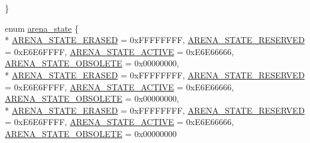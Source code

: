 \begin{DoxyCompactItemize}
 \}
\item 
enum \hyperlink{group___p_i_o_s___f_l_a_s_h_f_s_gaa936149cfd5559190d20879c10e0fcee}{arena\-\_\-state} \{ \\*
\hyperlink{group___p_i_o_s___f_l_a_s_h_f_s_ggaa936149cfd5559190d20879c10e0fceea0868f5f69dae5f489f86f324fb2ec026}{A\-R\-E\-N\-A\-\_\-\-S\-T\-A\-T\-E\-\_\-\-E\-R\-A\-S\-E\-D} = 0x\-F\-F\-F\-F\-F\-F\-F\-F, 
\hyperlink{group___p_i_o_s___f_l_a_s_h_f_s_ggaa936149cfd5559190d20879c10e0fceeac20424e4b3a3a918490e8c307996fe7c}{A\-R\-E\-N\-A\-\_\-\-S\-T\-A\-T\-E\-\_\-\-R\-E\-S\-E\-R\-V\-E\-D} = 0x\-E6\-E6\-F\-F\-F\-F, 
\hyperlink{group___p_i_o_s___f_l_a_s_h_f_s_ggaa936149cfd5559190d20879c10e0fceea8bac821a323307ac4aa7b2de12f4896b}{A\-R\-E\-N\-A\-\_\-\-S\-T\-A\-T\-E\-\_\-\-A\-C\-T\-I\-V\-E} = 0x\-E6\-E66666, 
\hyperlink{group___p_i_o_s___f_l_a_s_h_f_s_ggaa936149cfd5559190d20879c10e0fceea3943698e7097dd06c6b54f71548d426e}{A\-R\-E\-N\-A\-\_\-\-S\-T\-A\-T\-E\-\_\-\-O\-B\-S\-O\-L\-E\-T\-E} = 0x00000000, 
\\*
\hyperlink{group___p_i_o_s___f_l_a_s_h_f_s_ggaa936149cfd5559190d20879c10e0fceea0868f5f69dae5f489f86f324fb2ec026}{A\-R\-E\-N\-A\-\_\-\-S\-T\-A\-T\-E\-\_\-\-E\-R\-A\-S\-E\-D} = 0x\-F\-F\-F\-F\-F\-F\-F\-F, 
\hyperlink{group___p_i_o_s___f_l_a_s_h_f_s_ggaa936149cfd5559190d20879c10e0fceeac20424e4b3a3a918490e8c307996fe7c}{A\-R\-E\-N\-A\-\_\-\-S\-T\-A\-T\-E\-\_\-\-R\-E\-S\-E\-R\-V\-E\-D} = 0x\-E6\-E6\-F\-F\-F\-F, 
\hyperlink{group___p_i_o_s___f_l_a_s_h_f_s_ggaa936149cfd5559190d20879c10e0fceea8bac821a323307ac4aa7b2de12f4896b}{A\-R\-E\-N\-A\-\_\-\-S\-T\-A\-T\-E\-\_\-\-A\-C\-T\-I\-V\-E} = 0x\-E6\-E66666, 
\hyperlink{group___p_i_o_s___f_l_a_s_h_f_s_ggaa936149cfd5559190d20879c10e0fceea3943698e7097dd06c6b54f71548d426e}{A\-R\-E\-N\-A\-\_\-\-S\-T\-A\-T\-E\-\_\-\-O\-B\-S\-O\-L\-E\-T\-E} = 0x00000000, 
\\*
\hyperlink{group___p_i_o_s___f_l_a_s_h_f_s_ggaa936149cfd5559190d20879c10e0fceea0868f5f69dae5f489f86f324fb2ec026}{A\-R\-E\-N\-A\-\_\-\-S\-T\-A\-T\-E\-\_\-\-E\-R\-A\-S\-E\-D} = 0x\-F\-F\-F\-F\-F\-F\-F\-F, 
\hyperlink{group___p_i_o_s___f_l_a_s_h_f_s_ggaa936149cfd5559190d20879c10e0fceeac20424e4b3a3a918490e8c307996fe7c}{A\-R\-E\-N\-A\-\_\-\-S\-T\-A\-T\-E\-\_\-\-R\-E\-S\-E\-R\-V\-E\-D} = 0x\-E6\-E6\-F\-F\-F\-F, 
\hyperlink{group___p_i_o_s___f_l_a_s_h_f_s_ggaa936149cfd5559190d20879c10e0fceea8bac821a323307ac4aa7b2de12f4896b}{A\-R\-E\-N\-A\-\_\-\-S\-T\-A\-T\-E\-\_\-\-A\-C\-T\-I\-V\-E} = 0x\-E6\-E66666, 
\hyperlink{group___p_i_o_s___f_l_a_s_h_f_s_ggaa936149cfd5559190d20879c10e0fceea3943698e7097dd06c6b54f71548d426e}{A\-R\-E\-N\-A\-\_\-\-S\-T\-A\-T\-E\-\_\-\-O\-B\-S\-O\-L\-E\-T\-E} = 0x00000000

\end{DoxyCompactItemize}
